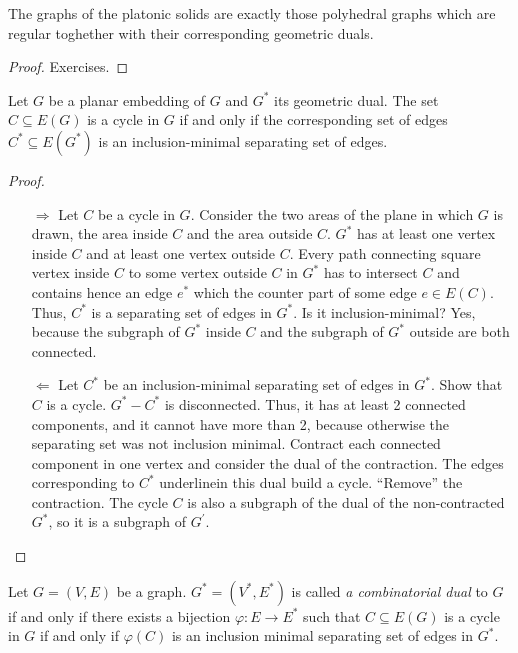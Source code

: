 \documentclass[aagt.tex]{subfiles}
\begin{document}
\begin{cor}
  The graphs of the platonic solids are exactly those polyhedral graphs which are regular toghether with their corresponding geometric duals.
\end{cor}

\begin{proof}
  Exercises.
\end{proof}

\begin{theorem}[4.15 Whitney 1934]
  Let $G$ be a planar embedding of $G$ and $G^\ast$ its geometric dual. 
  The set $C \subseteq E(G)$ is a cycle in $G$ if and only if the corresponding set of edges $C^\ast \subseteq E(G^\ast)$ is an inclusion-minimal separating set of edges.
\end{theorem}

\begin{proof}
  \begin{enumerate}
    \item[$\Rightarrow$] Let $C$ be a cycle in $G$. Consider the two areas of the plane in which $G$ is drawn, the area inside $C$ and the area outside $C$.
    $G^\ast$ has at least one vertex inside $C$ and at least one vertex outside $C$.
    Every path connecting square vertex inside $C$ to some vertex outside $C$ in $G^\ast$ has to intersect $C$ and contains hence an edge $e^\ast$ which the counter part of some edge $e \in E(C)$.
    Thus, $C^\ast$ is a separating set of edges in $G^\ast$.
    Is it inclusion-minimal? Yes, because the subgraph of $G^\ast$ inside $C$ and the subgraph of $G^\ast$ outside are both connected.
    \item[$\Leftarrow$] Let $C^\ast$ be an inclusion-minimal separating set of edges in $G^\ast$.
    Show that $C$ is a cycle.
    $G^\ast - C^\ast$ is disconnected. Thus, it has at least 2 connected components,  and it cannot have more than 2, because otherwise the separating set was not inclusion minimal.
    Contract each connected component in one vertex and consider the dual of the contraction.
    The edges corresponding to $C^\ast$ underline{in this dual} build a cycle. \enquote{Remove} the contraction.
    The cycle $C$ is also a subgraph of the dual of the non-contracted $G^\ast$, so it is a subgraph of $G^\prime$.
  \end{enumerate}
\end{proof}

\begin{defi*}
  Let $G = (V,E)$ be a graph. $G^\ast = (V^\ast,E^\ast)$ is called \emph{a combinatorial dual} to $G$ if and only if there exists a bijection $\varphi: E \to E^\ast$ such that $C \subseteq E(G)$ is a cycle in $G$ if and only if $\varphi(C)$ is an inclusion minimal separating set of edges in $G^\ast$.
\end{defi*}
\end{document}
